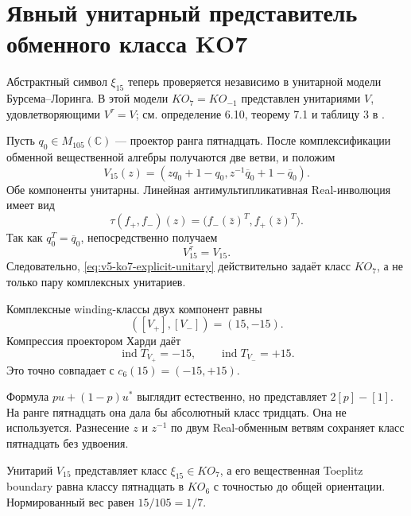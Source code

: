 \chapter{Явный унитарный представитель обменного класса KO7}

Абстрактный символ $\xi_{15}$ теперь проверяется независимо в унитарной
модели Бурсема--Лоринга. В этой модели $KO_7=KO_{-1}$ представлен
унитариями $V$, удовлетворяющими $V^\tau=V$; см. определение 6.10,
теорему 7.1 и таблицу 3 в .

Пусть $q_0\in M_{105}(\mathbb C)$ --- проектор ранга пятнадцать. После
комплексификации обменной вещественной алгебры получаются две ветви, и
положим
\begin{equation}
 V_{15}(z)=\left(
 zq_0+1-q_0,
 z^{-1}\overline q_0+1-\overline q_0
 \right).
 \label{eq:v5-ko7-explicit-unitary}
\end{equation}
Обе компоненты унитарны. Линейная антимультипликативная Real-инволюция
имеет вид
\begin{equation}
 \tau(f_+,f_-)(z)=
 \bigl(f_-(\bar z)^T,f_+(\bar z)^T\bigr).
\end{equation}
Так как $q_0^T=\overline q_0$, непосредственно получаем
\begin{equation}
 V_{15}^{\tau}=V_{15}.
\end{equation}
Следовательно, \eqref{eq:v5-ko7-explicit-unitary} действительно задаёт
класс $KO_7$, а не только пару комплексных унитариев.

Комплексные winding-классы двух компонент равны
\begin{equation}
 ([V_+],[V_-])=(15,-15).
\end{equation}
Компрессия проектором Харди даёт
\begin{equation}
 \operatorname{ind}T_{V_+}=-15,
 \qquad
 \operatorname{ind}T_{V_-}=+15.
\end{equation}
Это точно совпадает с $c_6(15)=(-15,+15)$.

\begin{remark}
Формула $pu+(1-p)u^*$ выглядит естественно, но представляет
$2[p]-[1]$. На ранге пятнадцать она дала бы абсолютный класс тридцать.
Она не используется. Разнесение $z$ и $z^{-1}$ по двум Real-обменным
ветвям сохраняет класс пятнадцать без удвоения.
\end{remark}

\begin{theorem}
Унитарий $V_{15}$ представляет класс $\xi_{15}\in KO_7$, а его
вещественная Toeplitz boundary равна классу пятнадцать в $KO_6$ с
точностью до общей ориентации. Нормированный вес равен $15/105=1/7$.
\end{theorem}

